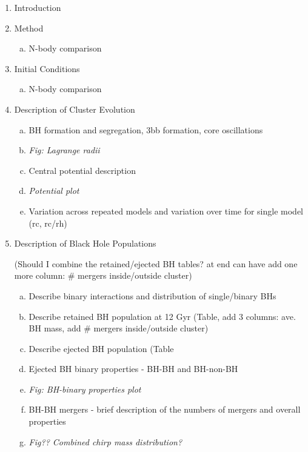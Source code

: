 \documentclass[12pt,preprint]{aastex}
\begin{document}
\begin{enumerate}[1.]

	\item Introduction

	\item Method
	\begin{enumerate}[a.]
		\item N-body comparison
	\end{enumerate}

	\item Initial Conditions
	\begin{enumerate}[a.]
		\item N-body comparison
	\end{enumerate}

	\item Description of Cluster Evolution
	\begin{enumerate}[a.]
		\item BH formation and segregation, 3bb formation, core oscillations
		\item \emph{Fig: Lagrange radii}
		\item Central potential description
		\item \emph{Potential plot}
		\item Variation across repeated models and variation over time for single model (rc, rc/rh)
	\end{enumerate}
	
	
	\item Description of Black Hole Populations
	
	(Should I combine the retained/ejected BH tables? at end can have add one more column: \# mergers inside/outside cluster)
	\begin{enumerate}[a.]
		\item Describe binary interactions and distribution of single/binary BHs
		\item Describe retained BH population at 12 Gyr (Table, add 3 columns: ave. BH mass, add \# mergers inside/outside cluster)
		\item Describe ejected BH population (Table
		\item Ejected BH binary properties - BH-BH and BH-non-BH
		\item \emph{Fig: BH-binary properties plot}
		\item BH-BH mergers - brief description of the numbers of mergers and overall properties
		\item \emph{Fig?? Combined chirp mass distribution?}
	\end{enumerate}	
	

\end{enumerate}
\end{document}
